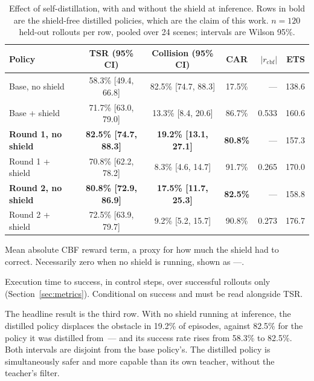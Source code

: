 \begin{table}[htbp]
\centering
\begin{threeparttable}
\caption[Effect of self-distillation on safety and task performance]{%
  Effect of self-distillation, with and without the shield at inference. Rows in bold are the
  shield-free distilled policies, which are the claim of this work. $n = 120$ held-out rollouts
  per row, pooled over 24 scenes; intervals are Wilson 95\%.}
\label{tab:internalisation}
\begin{tabular}{lcccrr}
\toprule
\textbf{Policy} & \textbf{TSR (95\% CI)} & \textbf{Collision (95\% CI)} & \textbf{CAR}
  & $\lvert r_{\mathrm{cbf}}\rvert$\tnote{a} & \textbf{ETS}\tnote{b} \\
\midrule
Base, no shield        & 58.3\% [49.4, 66.8] & 82.5\% [74.7, 88.3] & 17.5\% & ---   & 138.6 \\
Base + shield          & 71.7\% [63.0, 79.0] & 13.3\% [\phantom{0}8.4, 20.6] & 86.7\% & 0.533 & 160.6 \\
\addlinespace[3pt]
\textbf{Round 1, no shield} & \textbf{82.5\% [74.7, 88.3]} & \textbf{19.2\% [13.1, 27.1]}
  & \textbf{80.8\%} & --- & 157.3 \\
Round 1 + shield       & 70.8\% [62.2, 78.2] & \phantom{0}8.3\% [\phantom{0}4.6, 14.7] & 91.7\% & 0.265 & 170.0 \\
\addlinespace[3pt]
\textbf{Round 2, no shield} & \textbf{80.8\% [72.9, 86.9]} & \textbf{17.5\% [11.7, 25.3]}
  & \textbf{82.5\%} & --- & 158.8 \\
Round 2 + shield       & 72.5\% [63.9, 79.7] & \phantom{0}9.2\% [\phantom{0}5.2, 15.7] & 90.8\% & 0.273 & 176.7 \\
\bottomrule
\end{tabular}
\begin{tablenotes}[flushleft]\footnotesize
\item[a] Mean absolute CBF reward term, a proxy for how much the shield had to correct. Necessarily
  zero when no shield is running, shown as ---.
\item[b] Execution time to success, in control steps, over successful rollouts only
  (Section~\ref{sec:metrics}). Conditional on success and must be read alongside TSR.
\end{tablenotes}
\end{threeparttable}
\end{table}

The headline result is the third row. With no shield running at inference, the distilled policy
displaces the obstacle in 19.2\% of episodes, against 82.5\% for the policy it was distilled
from~--- and its success rate rises from 58.3\% to 82.5\%. Both intervals are disjoint from the
base policy's. The distilled policy is simultaneously safer and more capable than its own teacher,
without the teacher's filter.

